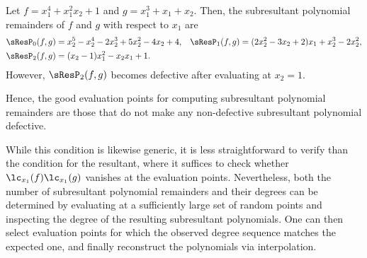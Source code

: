 \begin{example}
    Let $f=x_1^4+x_1^2x_2+1$ and $g=x_1^3+x_1+x_2$. Then, the subresultant polynomial remainders of $f$ and $g$ with respect to $x_1$ are
    \begin{align*}
        \sResP_{0}(f,g) & =x_2^5-x_2^4-2x_2^3+5x_2^2-4x_2+4, & \sResP_{1}(f,g) & =(2x_2^2-3x_2+2)x_1+x_2^3-2x_2^2, \\
        \sResP_{2}(f,g) & =(x_2-1)x_1^2-x_2x_1+1.
    \end{align*}
    However, $\sResP_{2}(f,g)$ becomes defective after evaluating at $x_2=1$.
\end{example}

Hence, the good evaluation points for computing subresultant polynomial remainders are those that do not make any non-defective subresultant polynomial defective.

While this condition is likewise generic, it is less straightforward to verify than the condition for the resultant, where it suffices to check whether $\lc_{x_1}(f)\lc_{x_1}(g)$ vanishes at the evaluation points. Nevertheless, both the number of subresultant polynomial remainders and their degrees can be determined by evaluating at a sufficiently large set of random points and inspecting the degree of the resulting subresultant polynomials. One can then select evaluation points for which the observed degree sequence matches the expected one, and finally reconstruct the polynomials via interpolation.
